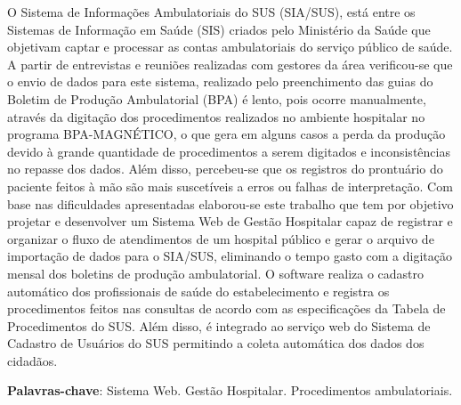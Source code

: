 \documentclass[
12pt,			     	%
a4paper,                %
oneside,                %
brazil		          	%
]{configuracoes}		%
\begin{document}
\setlength{\absparsep}{18pt}
\begin{resumo}

O Sistema de Informações Ambulatoriais do SUS (SIA/SUS), está entre os Sistemas de Informação em Saúde (SIS) criados pelo Ministério da Saúde que objetivam captar e processar as contas ambulatoriais do serviço público de saúde. A partir de entrevistas e reuniões realizadas com gestores da área verificou-se que o envio de dados para este sistema, realizado pelo preenchimento das guias do Boletim de Produção Ambulatorial (BPA) é lento, pois ocorre manualmente, através da digitação dos procedimentos realizados no ambiente hospitalar no programa BPA-MAGNÉTICO, o que gera em alguns casos a perda da produção devido à grande quantidade de procedimentos a serem digitados e inconsistências no repasse dos dados. Além disso, percebeu-se que os registros do prontuário do paciente feitos à mão são mais suscetíveis a erros ou falhas de interpretação. Com base nas dificuldades apresentadas elaborou-se este trabalho que tem por objetivo projetar e desenvolver um Sistema Web de Gestão Hospitalar capaz de registrar e organizar o fluxo de atendimentos de um hospital público e gerar o arquivo de importação de dados para o SIA/SUS, eliminando o tempo gasto com a digitação mensal dos boletins de produção ambulatorial.  O software realiza o cadastro automático dos profissionais de saúde do estabelecimento e registra os procedimentos feitos nas consultas de acordo com as especificações da Tabela de Procedimentos do SUS. Além disso, é integrado ao serviço web do Sistema de Cadastro de Usuários do SUS permitindo a coleta automática dos dados dos cidadãos.
    
	\noindent
	\textbf{Palavras-chave}: Sistema Web. Gestão Hospitalar. Procedimentos ambulatoriais.
\end{resumo}
\end{document}
